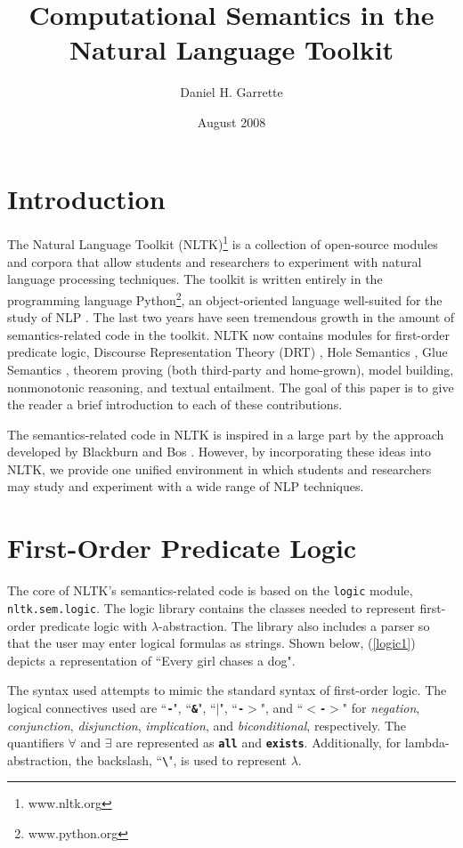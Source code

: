 \documentclass{article}
\newcommand{\dhgcode}[1]{{\tt #1}}
\begin{document}
\title{Computational Semantics in the Natural Language Toolkit}
\author{Daniel H. Garrette}
\date{August 2008}
\maketitle

\section{Introduction}
The Natural Language Toolkit (NLTK)\footnote{www.nltk.org} is a collection of open-source modules and corpora that allow students and researchers to experiment with natural language processing techniques.  The toolkit is written entirely in the programming language Python\footnote{www.python.org}, an object-oriented language well-suited for the study of NLP \cite{Multidisciplinary}.  The last two years have seen tremendous growth in the amount of semantics-related code in the toolkit.  NLTK now contains modules for first-order predicate logic, Discourse Representation Theory (DRT) \cite{KampReyle}, Hole Semantics \cite{BB}, Glue Semantics \cite{Dalrymple2001}, theorem proving (both third-party and home-grown), model building, nonmonotonic reasoning, and textual entailment.  The goal of this paper is to give the reader a brief introduction to each of these contributions.

The semantics-related code in NLTK is inspired in a large part by the approach developed by Blackburn and Bos \cite{BB}.  However, by incorporating these ideas into NLTK, we provide one unified environment in which students and researchers may study and experiment with a wide range of NLP techniques.

\section{First-Order Predicate Logic}
The core of NLTK's semantics-related code is based on the \dhgcode{logic} module, \dhgcode{nltk.sem.logic}.  The logic library contains the classes needed to represent first-order predicate logic with $\lambda$-abstraction.  The library also includes a parser so that the user may enter logical formulas as strings.  Shown below, (\ref{logic1}) depicts a representation of ``Every girl chases a dog".  

\enumsentence{\label{logic1}\dhgcode{all x.(girl(x) -$>$ exists y.(dog(x) \& chase(x,y)))}}

The syntax used attempts to mimic the standard syntax of first-order logic.  The logical connectives used are ``\textbf{\dhgcode{-}}", ``\textbf{\dhgcode{\&}}", ``\textbf{\dhgcode{$|$}}", ``\textbf{\dhgcode{-$>$}}", and ``\textbf{\dhgcode{$<$-$>$}}" for \emph{negation}, \emph{conjunction}, \emph{disjunction}, \emph{implication}, and \emph{biconditional}, respectively.  The quantifiers $\forall$ and $\exists$ are represented as \textbf{\dhgcode{all}} and \textbf{\dhgcode{exists}}.  Additionally, for lambda-abstraction, the backslash, ``\textbf{\dhgcode{\textbackslash}}", is used to represent \textbf{\emph{$\lambda$}}.
\end{document}
